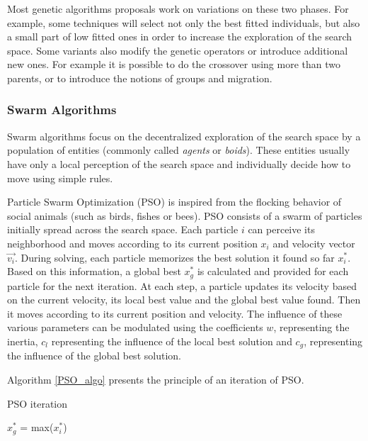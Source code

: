 Most genetic algorithms proposals work on variations on these two phases. For example, some techniques will select not only the best fitted individuals, but also a small part of low fitted ones in order to increase the exploration of the search space. Some variants also modify the genetic operators or introduce additional new ones. For example it is possible to do the crossover using more than two parents, or to introduce the notions of groups and migration.

\subsubsection{Swarm Algorithms}

Swarm algorithms focus on the decentralized exploration of the search space by a population of entities (commonly called \emph{agents} or \emph{boids}). These entities usually have only a local perception of the search space and individually decide how to move using simple rules.

Particle Swarm Optimization (PSO) \cite{kennedy1995particle} is inspired from the flocking behavior of social animals (such as birds, fishes or bees). PSO consists of a swarm of particles initially spread across the search space. Each particle $i$ can perceive its neighborhood and moves according to its current position $x_i$ and velocity vector $\overrightarrow{v_i}$.
During solving, each particle memorizes the best solution it found so far $x_i^*$. Based on this information, a global best $x_g^*$ is calculated and provided for each particle for the next iteration.
At each step, a particle updates its velocity based on the current velocity, its local best value and the global best value found. Then it moves according to its current position and velocity. The influence of these various parameters can be modulated using the coefficients $w$, representing the inertia, $c_l$ representing the influence of the local best solution and $c_g$, representing the influence of the global best solution.

Algorithm \ref{PSO_algo} presents the principle of an iteration of PSO.

\begin{algorithm}
\caption{PSO iteration}\label{PSO_algo}

	$x_g^*$ = max($x_i^*$)\;

\end{algorithm}

